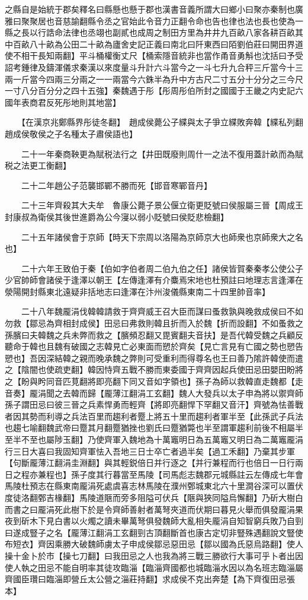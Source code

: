 之縣自是始統于郡矣釋名曰縣懸也懸于郡也漢書音義所謂大曰鄉小曰聚亦秦制也廣雅曰聚聚居也音慈諭翻縣令丞之官始此令音力正翻令命也告也律也法也長也使為一縣之長以行誥命法律也丞翊也副貳也成周之制田方里為井井九百畝八家各耕百畝其中百畝八十畝為公田二十畝為廬舍史記正義曰南北曰阡東西曰陌劉伯莊曰開田界道使不相干長知兩翻】平斗桶權衡丈尺【桶索隱音統非也當作甬音勇斛也沈括曰予受詔考鍾律及鑄渾儀求秦漢以來度量斗升計六斗當今之一斗七升九合秤三斤當今十三兩一斤當今四兩三分兩之一一兩當今六銖半為升中方古尺二寸五分十分分之三今尺一寸八分百分分之四十五強】秦魏遇于彤【彤周彤伯所封之國國于王畿之内史記六國年表商君反死彤地則其地當】

　　【在漢京兆鄭縣界彤徒冬翻】　趙成侯薨公子緤與太子爭立緤敗奔韓【緤私列翻趙成侯敬侯之子名種太子肅侯語也】

　　二十一年秦商鞅更為賦税法行之【井田既廢則周什一之法不復用蓋計畝而為賦税之法更工衡翻】

　　二十二年趙公子范襲邯鄲不勝而死【邯音寒鄲音丹】

　　二十三年齊殺其大夫牟　魯康公薨子景公偃立衛更貶號曰侯服屬三晉【周成王封康叔為衛侯其後世進爵為公今寖以弱小貶號曰侯貶悲檢翻】

　　二十五年諸侯會于京師【時天下宗周以洛陽為京師京大也師衆也京師衆大之名也】

　　二十六年王致伯于秦【伯如字伯者周二伯九伯之任】諸侯皆賀秦秦孝公使公子少官帥師會諸侯于逢澤以朝王【左傳逢澤有介麋焉宋地也杜預註曰地理志言逢澤在滎陽開封縣東北遠疑非括地志曰逢澤在汴州浚儀縣東南二十四里帥音率】

　　二十八年魏龎涓伐韓韓請救于齊齊威王召大臣而謀曰蚤救孰與晚救成侯曰不如勿救【鄒忌為齊相封成侯】田忌曰弗救則韓且折而入於魏【折而設翻】不如蚤救之孫臏曰夫韓魏之兵未弊而救之【臏頻忍翻又毘賓翻夫音扶】是吾代韓受魏之兵顧反聽命于韓也且魏有破國之志韓見亡必東面而愬於齊矣【見亡言見有亡國之勢也愬告愬也】吾因深結韓之親而晚承魏之弊則可受重利而得尊名也王曰善乃隂許韓使而遣之【陰闇也使疏吏翻】韓因恃齊五戰不勝而東委國于齊齊因起兵使田忌田嬰田盼將之【盼與盻同音匹莧翻將即亮翻下同又音如字領也】孫子為師以救韓直走魏都【走音奏】龎涓聞之去韓而歸【龎薄江翻涓工玄翻】魏人大發兵以太子申為將以禦齊師孫子謂田忌曰彼三晉之兵素悍勇而輕齊【將即亮翻悍下罕翻又音汗】齊號為怯善戰者因其勢而利導之兵法百里而趨利者蹷上將五十里而趨利者軍半至【此孫武子兵法也趨七喻翻魏武帝曰蹷其月翻蹷猶挫也劉氏曰蹷猶斃也半至謂軍趨利前後不相屬半至半不至也屬陟玉翻】乃使齊軍入魏地為十萬竈明日為五萬竈又明日為二萬竈龎涓行三日大喜曰我固知齊軍怯入吾地三日士卒亡者過半矣【過工禾翻】乃棄其步軍【句斷龎薄江翻涓圭淵翻】與其輕鋭倍日并行逐之【并行兼程而行也倍日一日行兩日之程亦兼程也】孫子度其行暮當至馬陵【司馬彪志魏郡元城縣註云左傳成七年會馬陵杜預志在縣東南龎涓死處虞喜志林馬陵在濮州鄄城東北六十里澗谷深可以置伏度徒洛翻鄄吉椽翻】馬陵道陿而旁多阻隘可伏兵【陿與狹同隘烏懈翻】乃斫大樹白而書之曰龎涓死此樹下於是令齊師善射者萬弩夾道而伏期曰暮見火舉而俱發龎涓果夜到斫木下見白書以火燭之讀未畢萬弩俱發魏師大亂相失龎涓自知智窮兵敗乃自剄曰遂成豎子之名【龎薄江翻涓工玄翻剄古頂翻斷首也康古定切非豎殊遇翻說文豎使布短衣】齊因乘勝大破魏師虜太子申成侯鄒忌惡田忌【鄒以國為氏惡烏路翻】使人操十金卜於市【操七刀翻】曰我田忌之人也我為將三戰三勝欲行大事可乎卜者出因使人執之田忌不能自明率其徒攻臨淄【臨淄齊國都也城臨淄水因以為名班志臨淄屬齊國臣瓚曰臨淄即營丘太公營之淄莊持翻】求成侯不克出奔楚【為下齊復田忌張本】

